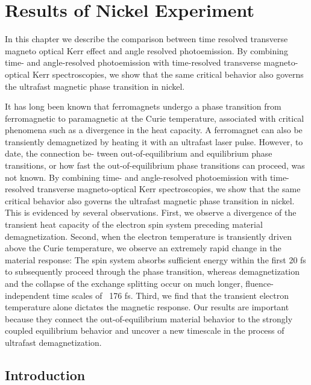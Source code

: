 \chapter{Results of Nickel Experiment}
\label{Critical Behavior}

In this chapter we describe the comparison between time resolved transverse magneto optical Kerr effect and angle resolved photoemission. By combining time- and angle-resolved photoemission with time-resolved transverse magneto-optical Kerr spectroscopies, we show that the same critical behavior also governs the ultrafast magnetic phase transition in nickel.

It has long been known that ferromagnets undergo a phase transition from ferromagnetic to paramagnetic at the Curie temperature, associated with critical phenomena such as a divergence in the heat capacity. A ferromagnet can also be transiently demagnetized by heating it with an ultrafast laser pulse. However, to date, the connection be- tween out-of-equilibrium and equilibrium phase transitions, or how fast the out-of-equilibrium phase transitions can proceed, was not known. By combining time- and angle-resolved photoemission with time-resolved transverse magneto-optical Kerr spectroscopies, we show that the same critical behavior also governs the ultrafast magnetic phase transition in nickel. This is evidenced by several observations. First, we observe a divergence of the transient heat capacity of the electron spin system preceding material demagnetization. Second, when the electron temperature is transiently driven above the Curie temperature, we observe an extremely rapid change in the material response: The spin system absorbs sufficient energy within the first 20 fs to subsequently proceed through the phase transition, whereas demagnetization and the collapse of the exchange splitting occur on much longer, fluence- independent time scales of ~176 fs. Third, we find that the transient electron temperature alone dictates the magnetic response. Our results are important because they connect the out-of-equilibrium material behavior to the strongly coupled equilibrium behavior and uncover a new timescale in the process of ultrafast demagnetization.

\section{Introduction}

